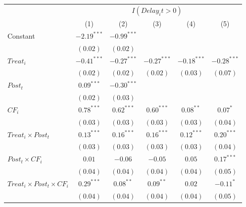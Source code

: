\documentclass[
]{article}
\begin{document}
\begin{table}
\begin{center}
\begin{tabular}{l c c c c c}
\hline
 & \multicolumn{5}{c}{$I(Delay_it>0)$} \\
\cline{2-6}
 & (1) & (2) & (3) & (4) & (5) \\
\hline
Constant                                   & $-2.19^{***}$ & $-0.99^{***}$ &               &               &               \\
                                           & $(0.02)$      & $(0.02)$      &               &               &               \\
$Treat_i$                                  & $-0.41^{***}$ & $-0.27^{***}$ & $-0.27^{***}$ & $-0.18^{***}$ & $-0.28^{***}$ \\
                                           & $(0.02)$      & $(0.02)$      & $(0.02)$      & $(0.03)$      & $(0.07)$      \\
$Post_t$                                   & $0.09^{***}$  & $-0.30^{***}$ &               &               &               \\
                                           & $(0.02)$      & $(0.03)$      &               &               &               \\
$CF_i$                                     & $0.78^{***}$  & $0.62^{***}$  & $0.60^{***}$  & $0.08^{**}$   & $0.07^{*}$    \\
                                           & $(0.03)$      & $(0.03)$      & $(0.03)$      & $(0.03)$      & $(0.04)$      \\
$Treat_i \times Post_t$                    & $0.13^{***}$  & $0.16^{***}$  & $0.16^{***}$  & $0.12^{***}$  & $0.20^{***}$  \\
                                           & $(0.03)$      & $(0.03)$      & $(0.03)$      & $(0.03)$      & $(0.04)$      \\
$Post_t \times CF_i$                       & $0.01$        & $-0.06$       & $-0.05$       & $0.05$        & $0.17^{***}$  \\
                                           & $(0.04)$      & $(0.04)$      & $(0.04)$      & $(0.04)$      & $(0.05)$      \\
$Treat_i \times Post_t \times CF_i$        & $0.29^{***}$  & $0.08^{**}$   & $0.09^{**}$   & $0.02$        & $-0.11^{*}$   \\
                                           & $(0.04)$      & $(0.04)$      & $(0.04)$      & $(0.04)$      & $(0.05)$      \\

\end{tabular}
\end{center}
\end{table}
\end{document}
